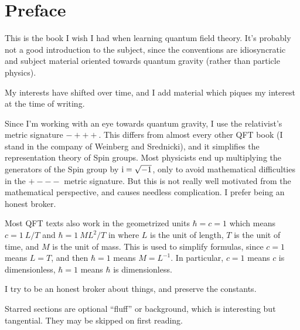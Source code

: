\chapter*{Preface}

\M
This is the book I wish I had when learning quantum field theory.
It's probably not a good introduction to the subject, since the
conventions are idiosyncratic and subject material oriented towards
quantum gravity (rather than particle physics).

My interests have shifted over time, and I add material which piques my
interest at the time of writing.

Since I'm working with an eye towards quantum gravity, I use the
relativist's metric signature $-+++$. This differs from almost every
other QFT book (I stand in the company of Weinberg and Srednicki), and
it simplifies the representation theory of Spin groups. Most physicists
end up multiplying the generators of the Spin group by $\mathrm{i}=\sqrt{-1}$,
only to avoid mathematical difficulties in the $+---$ metric
signature. But this is not really well motivated from the mathematical
perspective, and causes needless complication. I prefer being an honest
broker.

Most QFT texts also work in the geometrized units $\hbar=c=1$ which
means $c=1~L/T$ and $\hbar=1~ML^{2}/T$ in where $L$ is the unit of
length, $T$ is the unit of time, and $M$ is the unit of mass. This is
used to simplify formulas, since $c=1$ means $L=T$, and then $\hbar=1$
means $M=L^{-1}$. In particular, $c=1$ means $c$ is dimensionless,
$\hbar=1$ means $\hbar$ is dimensionless.

I try to be an honest broker about things, and preserve the constants.

Starred sections are optional ``fluff'' or background, which is
interesting but tangential. They may be skipped on first reading.

